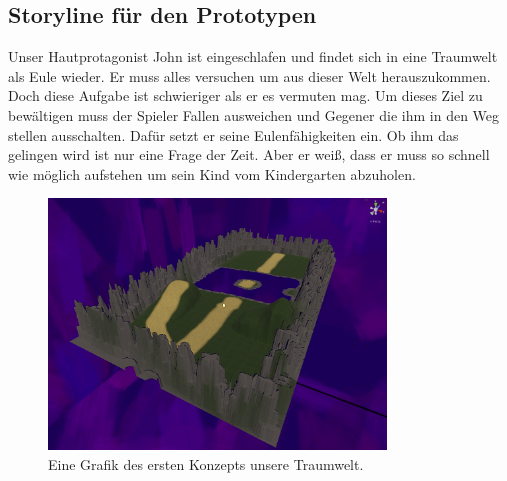 \subsection{Storyline für den Prototypen}
Unser Hautprotagonist John ist eingeschlafen und findet sich in eine Traumwelt als Eule wieder. Er muss alles versuchen um aus dieser Welt herauszukommen. Doch diese Aufgabe ist schwieriger als er es vermuten mag. Um dieses Ziel zu bewältigen muss der Spieler Fallen ausweichen und Gegener die ihm in den Weg stellen ausschalten. Dafür setzt er seine Eulenfähigkeiten ein. Ob ihm das gelingen wird ist nur eine Frage der Zeit. Aber er weiß, dass er muss so schnell wie möglich aufstehen um sein Kind vom Kindergarten abzuholen.

\begin{figure}[H]
    \centering
    \includegraphics[width=0.8\textwidth]{chapters/15/images/Dreamworld.png}
    \caption{Eine Grafik des ersten Konzepts unsere Traumwelt.}
    \label{UST-7}
\end{figure}


